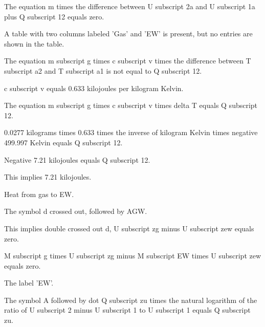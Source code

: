 The equation m times the difference between U subscript 2a and U subscript 1a plus Q subscript 12 equals zero.

A table with two columns labeled 'Gas' and 'EW' is present, but no entries are shown in the table.

The equation m subscript g times c subscript v times the difference between T subscript a2 and T subscript a1 is not equal to Q subscript 12.

c subscript v equals 0.633 kilojoules per kilogram Kelvin.

The equation m subscript g times c subscript v times delta T equals Q subscript 12.

0.0277 kilograms times 0.633 times the inverse of kilogram Kelvin times negative 499.997 Kelvin equals Q subscript 12.

Negative 7.21 kilojoules equals Q subscript 12.

This implies 7.21 kilojoules.

Heat from gas to EW.

The symbol d crossed out, followed by AGW.

This implies double crossed out d, U subscript zg minus U subscript zew equals zero.

M subscript g times U subscript zg minus M subscript EW times U subscript zew equals zero.

The label 'EW'.

The symbol A followed by dot Q subscript zu times the natural logarithm of the ratio of U subscript 2 minus U subscript 1 to U subscript 1 equals Q subscript zu.